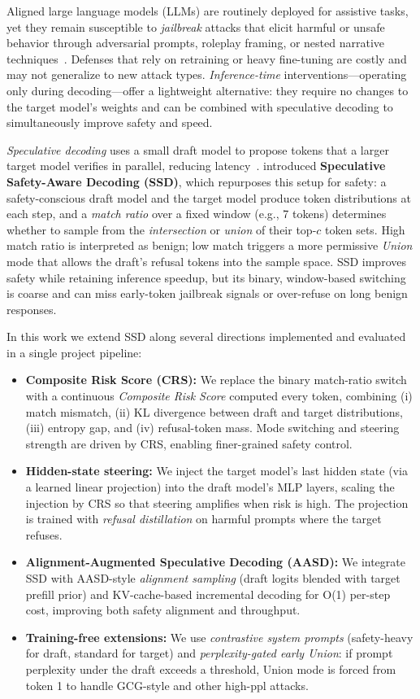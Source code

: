 \documentclass[11pt,a4paper]{article}
\begin{document}
Aligned large language models (LLMs) are routinely deployed for assistive tasks, yet they remain susceptible to \emph{jailbreak} attacks that elicit harmful or unsafe behavior through adversarial prompts, roleplay framing, or nested narrative techniques~\cite{deepinception,jbb}. Defenses that rely on retraining or heavy fine-tuning are costly and may not generalize to new attack types. \emph{Inference-time} interventions—operating only during decoding—offer a lightweight alternative: they require no changes to the target model's weights and can be combined with speculative decoding to simultaneously improve safety and speed.

\emph{Speculative decoding} uses a small draft model to propose tokens that a larger target model verifies in parallel, reducing latency~\cite{leviathan2023,specdecode}. \citet{ssd2025} introduced \textbf{Speculative Safety-Aware Decoding (SSD)}, which repurposes this setup for safety: a safety-conscious draft model and the target model produce token distributions at each step, and a \emph{match ratio} over a fixed window (e.g., 7 tokens) determines whether to sample from the \emph{intersection} or \emph{union} of their top-$c$ token sets. High match ratio is interpreted as benign; low match triggers a more permissive \emph{Union} mode that allows the draft's refusal tokens into the sample space. SSD improves safety while retaining inference speedup, but its binary, window-based switching is coarse and can miss early-token jailbreak signals or over-refuse on long benign responses.

In this work we extend SSD along several directions implemented and evaluated in a single project pipeline:

\begin{itemize}
  \item \textbf{Composite Risk Score (CRS):} We replace the binary match-ratio switch with a continuous \emph{Composite Risk Score} computed every token, combining (i) match mismatch, (ii) KL divergence between draft and target distributions, (iii) entropy gap, and (iv) refusal-token mass. Mode switching and steering strength are driven by CRS, enabling finer-grained safety control.
  \item \textbf{Hidden-state steering:} We inject the target model's last hidden state (via a learned linear projection) into the draft model's MLP layers, scaling the injection by CRS so that steering amplifies when risk is high. The projection is trained with \emph{refusal distillation} on harmful prompts where the target refuses.
  \item \textbf{Alignment-Augmented Speculative Decoding (AASD):} We integrate SSD with AASD-style \emph{alignment sampling} (draft logits blended with target prefill prior) and KV-cache-based incremental decoding for O(1) per-step cost, improving both safety alignment and throughput.
  \item \textbf{Training-free extensions:} We use \emph{contrastive system prompts} (safety-heavy for draft, standard for target) and \emph{perplexity-gated early Union}: if prompt perplexity under the draft exceeds a threshold, Union mode is forced from token 1 to handle GCG-style and other high-ppl attacks.
\end{itemize}
\end{document}

